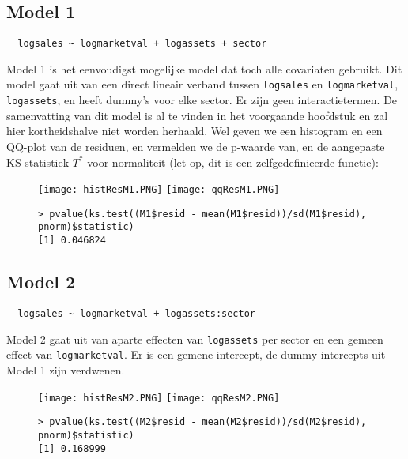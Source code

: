 \documentclass[a4paper, notitlepage]{report}
\begin{document}
\subsection{Model 1}
\begin{verbatim}
  logsales ~ logmarketval + logassets + sector
\end{verbatim}
  Model 1 is het eenvoudigst mogelijke model dat toch alle covariaten gebruikt. Dit model gaat uit van een direct lineair verband tussen \verb!logsales! en \verb!logmarketval!, \verb!logassets!, en heeft dummy's voor elke sector. Er zijn geen interactietermen. De samenvatting van dit model is al te vinden in het voorgaande hoofdstuk en zal hier kortheidshalve niet worden herhaald. Wel geven we een histogram en een QQ-plot van de residuen, en vermelden we de p-waarde van, en de aangepaste KS-statistiek $T^*$ voor normaliteit (let op, dit is een zelfgedefinieerde functie):
  
  \begin{figure}
  \begin{center}
    \texttt{[image: histResM1.PNG]}
    \texttt{[image: qqResM1.PNG]}
  \end{center}
  \begin{verbatim}
> pvalue(ks.test((M1$resid - mean(M1$resid))/sd(M1$resid), pnorm)$statistic)
[1] 0.046824
  \end{verbatim}
  \end{figure}
  
\subsection{Model 2}
\begin{verbatim}
  logsales ~ logmarketval + logassets:sector
\end{verbatim}
  Model 2 gaat uit van aparte effecten van \verb!logassets! per sector en een gemeen effect van \verb!logmarketval!. Er is een gemene intercept, de dummy-intercepts uit Model 1 zijn verdwenen.
  
  \begin{figure}
  \begin{center}
    \texttt{[image: histResM2.PNG]}
    \texttt{[image: qqResM2.PNG]}
  \end{center}
  \begin{verbatim}
> pvalue(ks.test((M2$resid - mean(M2$resid))/sd(M2$resid), pnorm)$statistic)
[1] 0.168999
  \end{verbatim}
  \end{figure}
  
\end{document}
